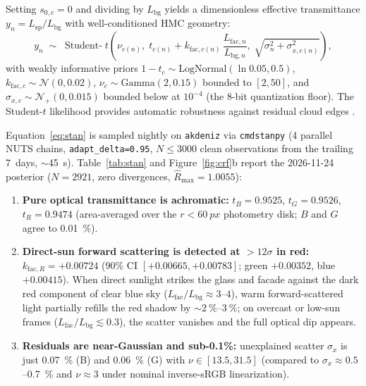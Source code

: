 \documentclass[11pt,a4paper]{article}
\newcommand{\Lbg}{L_{\mathrm{bg}}}
\newcommand{\Lsp}{L_{\mathrm{sp}}}
\newcommand{\Lfac}{L_{\mathrm{fac}}}
\newcommand{\code}[1]{\texttt{\small #1}}
\begin{document}
Setting $s_{0,c} = 0$ and dividing by $\Lbg$ yields a dimensionless effective
transmittance $y_n = \Lsp/\Lbg$ with well-conditioned HMC geometry:
\begin{equation}
  y_n \;\sim\; \operatorname{Student-}t\!\left(\nu_{c(n)},\;
    t_{c(n)} + k_{\mathrm{fac},c(n)}\,\frac{L_{\mathrm{fac},n}}{L_{\mathrm{bg},n}},\;
    \sqrt{\sigma_n^2 + \sigma_{x,c(n)}^2}\right),
  \label{eq:stan}
\end{equation}
with weakly informative priors $1 - t_c \sim \mathrm{LogNormal}(\ln 0.05, 0.5)$,
$k_{\mathrm{fac},c} \sim \mathcal{N}(0, 0.02)$,
$\nu_c \sim \mathrm{Gamma}(2, 0.15)$ bounded to $[2, 50]$, and
$\sigma_{x,c} \sim \mathcal{N}_+(0, 0.015)$ bounded below at $10^{-4}$ (the 8-bit
quantization floor). The Student-$t$ likelihood provides automatic robustness against
residual cloud edges \citep{lange1989robust}.

Equation~\eqref{eq:stan} is sampled nightly on \code{akdeniz} via \code{cmdstanpy}
\citep{carpenter2017stan} (4 parallel NUTS chains, \code{adapt\_delta=0.95},
$N \le 3000$ clean observations from the trailing 7~days, $\sim$\SI{45}{s}).
Table~\ref{tab:stan} and Figure~\ref{fig:crf}b report the 2026-11-24 posterior
($N = 2921$, zero divergences, $\hat{R}_{\max} = 1.0055$):
\begin{enumerate}
\item \textbf{Pure optical transmittance is achromatic:} $t_B = 0.9525$,
  $t_G = 0.9526$, $t_R = 0.9474$ (area-averaged over the $r < \SI{60}{px}$ photometry
  disk; $B$ and $G$ agree to \SI{0.01}{\percent}).
\item \textbf{Direct-sun forward scattering is detected at $>12\sigma$ in red:}
  $k_{\mathrm{fac},R} = +0.00724$ (90\% CI $[+0.00665, +0.00783]$; green $+0.00352$,
  blue $+0.00415$). When direct sunlight strikes the glass and facade against the dark
  red component of clear blue sky ($\Lfac/\Lbg \approx 3$--$4$), warm forward-scattered
  light partially refills the red shadow by $\sim\SIrange{2}{3}{\percent}$; on overcast
  or low-sun frames ($\Lfac/\Lbg \lesssim 0.3$), the scatter vanishes and the full
  optical dip appears.
\item \textbf{Residuals are near-Gaussian and sub-0.1\%:} unexplained scatter
  $\sigma_{x}$ is just \SI{0.07}{\percent} (B) and \SI{0.06}{\percent} (G) with
  $\nu \in [13.5, 31.5]$ (compared to $\sigma_x \approx 0.5$--\SI{0.7}{\percent} and
  $\nu \approx 3$ under nominal inverse-sRGB linearization).
\end{enumerate}
\end{document}
